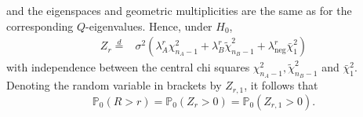 \documentclass{article}
\theoremstyle{definition}
\theoremstyle{remark}
\renewcommand{\P}{\mathbb{P}}  %
\newcommand{\eqdis}{\stackrel{d}{=}}
\begin{document}
and the eigenspaces and geometric multiplicities are the same as for the corresponding $Q$-eigenvalues. Hence, under $H_0$,
\begin{align}\label{eq:Z_r}
	Z_r \eqdis
	 & \sigma^2\left(
	\lambda_A^r \chi^2_{n_A -1}
	+ \lambda_B^r \tilde \chi^2_{n_B -1}
	+ \lambda_{\text{neg}}^r \bar \chi_1^2
	\right)
\end{align}
with independence between the central chi squares $\chi^2_{n_A -1}, \tilde \chi^2_{n_B -1}$ and $\bar \chi_1^2$. Denoting the random variable in brackets by $Z_{r, 1}$, it follows that
$$
	\P_0(R > r) = \P_0(Z_r > 0) = \P_0(Z_{r, 1} > 0).
$$
\end{document}
